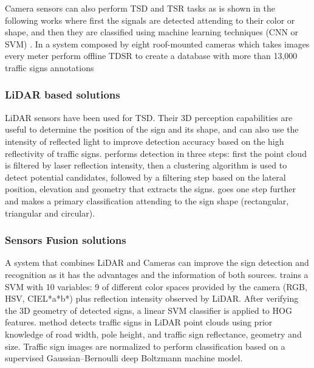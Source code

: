 \documentclass[journal]{IEEEtran}
\begin{document}
Camera sensors can also perform TSD and TSR tasks as is 
shown in the following works where first the signals are detected attending to
their color or shape, and then they are classified using machine learning techniques (CNN or SVM)
\cite{miyata2017automatic, yang2016towards, wali2015automatic}. In \cite{timofte2014multi}
a system composed by eight roof-mounted cameras which takes images every meter
perform offline TDSR to create a database with more than 13,000 traffic signs annotations


\subsubsection{LiDAR based solutions}
LiDAR sensors have been used for TSD. Their 3D perception capabilities are 
useful to determine the position of the sign and its shape, and can also use 
the intensity of reflected light to improve detection accuracy based on the
high reflectivity of traffic signs. \cite{gargoum2017automated} 
performs detection in three steps: first the point cloud is filtered by 
laser reflection intensity, then a clustering algorithm is used to detect 
potential candidates, followed by a filtering step based on the lateral 
position, elevation and geometry that extracts the signs. 
\cite{weng2016road} goes one step further and makes a primary 
classification attending to the sign shape (rectangular, triangular and 
circular).

\subsubsection{Sensors Fusion solutions}
A system that combines LiDAR and Cameras can improve the sign detection and 
recognition as it has the advantages and the information of both sources. 
\cite{zhou2014lidar} trains a SVM with 10 variables: 9 of different color 
spaces provided by the camera (RGB, HSV, CIEL*a*b*) plus reflection intensity 
observed by LiDAR. After verifying the 3D geometry of detected signs, a linear
SVM classifier is applied to HOG features.
\cite{guan2018robust} method detects traffic signs in LiDAR point clouds
using prior knowledge of road width, pole height, and traffic sign reflectance, 
geometry and size. Traffic sign images are normalized to perform classification 
based on a supervised Gaussian–Bernoulli deep Boltzmann machine model.
\end{document}
